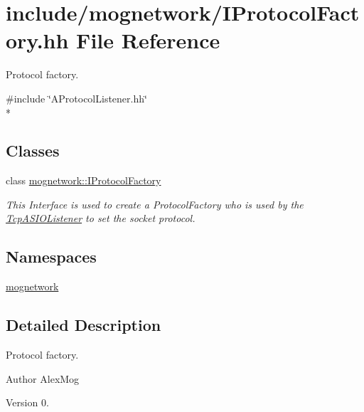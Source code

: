 \hypertarget{_i_protocol_factory_8hh}{\section{include/mognetwork/\-I\-Protocol\-Factory.hh File Reference}
\label{_i_protocol_factory_8hh}
}


Protocol factory.  


{\ttfamily \#include \char`\"{}A\-Protocol\-Listener.\-hh\char`\"{}}\\*
\subsection*{Classes}
\begin{DoxyCompactItemize}
\item 
class \hyperlink{classmognetwork_1_1_i_protocol_factory}{mognetwork\-::\-I\-Protocol\-Factory}
\begin{DoxyCompactList}\small\item\em This Interface is used to create a Protocol\-Factory who is used by the \hyperlink{classmognetwork_1_1_tcp_a_s_i_o_listener}{Tcp\-A\-S\-I\-O\-Listener} to set the socket protocol. \end{DoxyCompactList}\end{DoxyCompactItemize}
\subsection*{Namespaces}
\begin{DoxyCompactItemize}
\item 
\hyperlink{namespacemognetwork}{mognetwork}
\end{DoxyCompactItemize}


\subsection{Detailed Description}
Protocol factory. \begin{DoxyAuthor}{Author}
Alex\-Mog 
\end{DoxyAuthor}
\begin{DoxyVersion}{Version}
0. 
\end{DoxyVersion}

